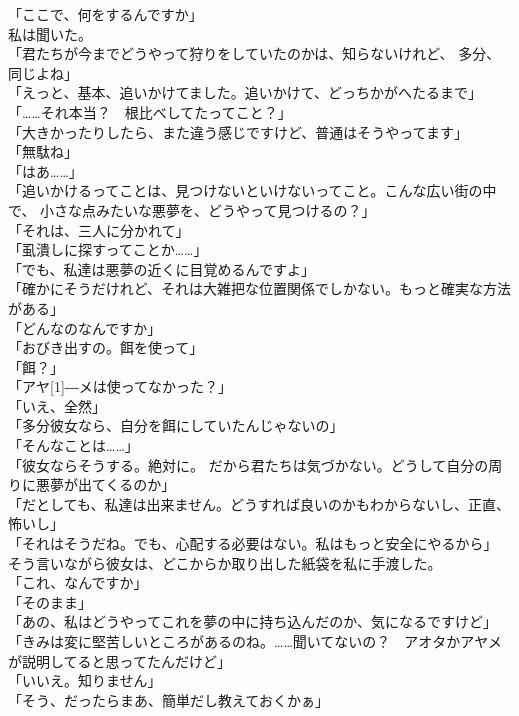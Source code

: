 \documentclass[../IHMain]{subfiles}
\begin{document}
「ここで、何をするんですか」\\
私は聞いた。\\
「君たちが今までどうやって狩りをしていたのかは、知らないけれど、
多分、同じよね」\\
「えっと、基本、追いかけてました。追いかけて、どっちかがへたるまで」\\
「……それ本当？　根比べしてたってこと？」\\
「大きかったりしたら、また違う感じですけど、普通はそうやってます」\\
「無駄ね」\\
「はあ……」\\
「追いかけるってことは、見つけないといけないってこと。こんな広い街の中で、
小さな点みたいな悪夢を、どうやって見つけるの？」\\
「それは、三人に分かれて」\\
「虱潰しに探すってことか……」\\
「でも、私達は悪夢の近くに目覚めるんですよ」\\
「確かにそうだけれど、それは大雑把な位置関係でしかない。もっと確実な方法がある」\\
「どんなのなんですか」\\
「おびき出すの。餌を使って」\\
「餌？」\\
「アヤ\scalebox{3}[1]{―}メは使ってなかった？」\\
「いえ、全然」\\
「多分彼女なら、自分を餌にしていたんじゃないの」\\
「そんなことは……」\\
「彼女ならそうする。絶対に。
だから君たちは気づかない。どうして自分の周りに悪夢が出てくるのか」\\
「だとしても、私達は出来ません。どうすれば良いのかもわからないし、正直、怖いし」\\
「それはそうだね。でも、心配する必要はない。私はもっと安全にやるから」\\
そう言いながら彼女は、どこからか取り出した紙袋を私に手渡した。\\
「これ、なんですか」\\
「そのまま」\\
「あの、私はどうやってこれを夢の中に持ち込んだのか、気になるですけど」\\
「きみは変に堅苦しいところがあるのね。……聞いてないの？　アオタかアヤメが説明してると思ってたんだけど」\\
「いいえ。知りません」\\
「そう、だったらまあ、簡単だし教えておくかぁ」\\
\end{document}
